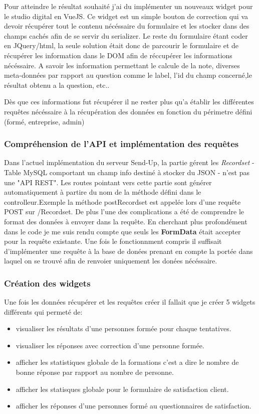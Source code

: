 Pour atteindre le résultat souhaité j'ai du implémenter un nouveaux widget pour le studio digital en VueJS. Ce widget est un simple bouton de correction qui va devoir récupérer tout le contenu nécéssaire du formulaire et les stocker dans des champs cachés afin de se servir du serializer. Le reste du formulaire étant coder en JQuery/html, la seule solution était donc de parcourir le formulaire et de récupérer les information dans le DOM afin de réccupérer les informations nécéssaire. A savoir les information permettant le calcule de la note, diverses meta-données par rapport au question comme le label, l'id du champ concerné,le résultat obtenu a la question, etc.. 

Dès que ces informations fut récupérer il ne rester plus qu'a établir les différentes requêtes nécéssaire à la récupération des données en fonction du périmetre défini (formé, entreprise, admin)


\subsubsection{Compréhension de l'API et implémentation des requêtes}

Dans l'actuel implémentation du serveur Send-Up, la partie gérent les \textit{Recordset} - Table MySQL comportant un champ info destiné à stocker du JSON - n'est pas une "API REST". Les routes pointant vers cette partie sont générer automatiquement à partire du nom de la méthode défini dans le controlleur.Exemple la méthode postRecordset est appelée lors d'une requête POST sur /Recordset. De plus l'une des complications a été de comprendre le format des données à envoyer dans la requête. En cherchant plus profondément dans le code je me suis rendu compte que seuls les \textbf{FormData} était accepter pour la requête existante.
Une fois le fonctionnment compris il suffisait d'implémenter une requête à la base de donées prenant en compte la portée dans laquel on se trouvé afin de renvoier uniquement les donées nécéssaire.

\subsubsection{Création des widgets}

Une fois les données récupérer et les requêtes créer il fallait que je créer 5 widgets différents qui permeté de: 
\begin{itemize}
    \item visualiser les résultats d'une personnes formée pour chaque tentatives. 
    \item  visualiser les réponses avec correction d'une personne formée.
    \item afficher les statistiques globale de la formations c'est a dire le nombre de bonne réponse par rapport au nombre de personne.
    \item afficher les statisques globale pour le formulaire de satisfaction client. 
    \item afficher les réponses d'une personnes formé au questionnaires de satisfaction.  
\end{itemize}

